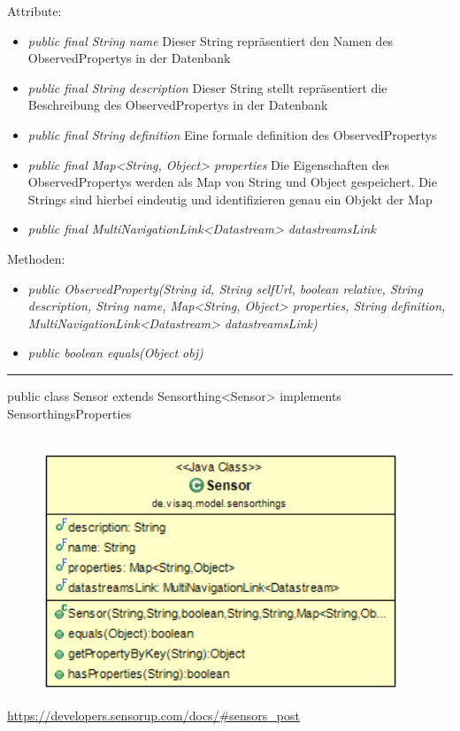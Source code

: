 Attribute:
\begin{itemize}
    \item \emph{public final String name} Dieser String repräsentiert den Namen des ObservedPropertys in der Datenbank
    \item \emph{public final String description} Dieser String stellt repräsentiert die Beschreibung des ObservedPropertys in der Datenbank
    \item \emph{public final String definition} Eine formale definition des ObservedPropertys
    \item \emph{public final Map<String, Object> properties} Die Eigenschaften des ObservedPropertys werden als Map von String und Object gespeichert. Die Strings sind hierbei eindeutig und identifizieren genau ein Objekt der Map
    \item \emph{public final MultiNavigationLink<Datastream> datastreamsLink} 
\end{itemize}
Methoden:
\begin{itemize}
    \item \emph{public ObservedProperty(String id, String selfUrl, boolean relative, String description, String name, Map<String, Object> properties, String definition, MultiNavigationLink<Datastream> datastreamsLink)}
    \item \emph{public boolean equals(Object obj)} 
\end{itemize}

\rule{\textwidth}{0.4pt}
public class Sensor extends Sensorthing<Sensor> implements SensorthingsProperties
\\\\
\begin{minipage}{0.4\textwidth}
    \begin{figure}[H]
        {\centering\includegraphics[width=0.95\textwidth]{media/backend/modell/classes/Sensor.png}}
    \end{figure}
    \end{minipage} \hfill
\begin{minipage}{0.6\textwidth}
    \url{https://developers.sensorup.com/docs/#sensors_post}
\end{minipage}

